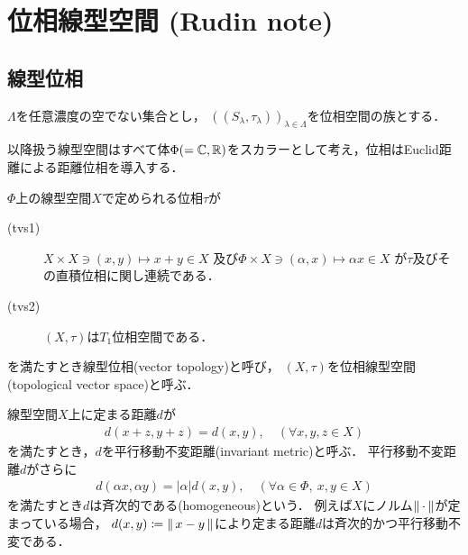 \section{位相線型空間 (Rudin note)}
\subsection{線型位相}
	\begin{screen}
		\begin{thm}[多変数連続写像は一変数写像として連続]
		\label{thm:multivariable_continuous_mapping_is_one_variable_continuous}
			$\Lambda$を任意濃度の空でない集合とし，
			$\left( (S_\lambda,\tau_\lambda) \right)_{\lambda \in \Lambda}$を位相空間の族とする．
			
		\end{thm}
	\end{screen}
	
	以降扱う線型空間はすべて体$\Phi (=\mathbb{C},\mathbb{R})$をスカラーとして考え，位相はEuclid距離による距離位相を導入する．
	
	\begin{screen}
		\begin{dfn}[位相線型空間]\label{def:topological_vector_space}
			$\Phi$上の線型空間$X$で定められる位相$\tau$が
			\begin{description}
				\item[(tvs1)] $X \times X \ni (x,y) \longmapsto x+y \in X$
					及び$\Phi \times X \ni (\alpha,x) \longmapsto \alpha x \in X$
					が$\tau$及びその直積位相に関し連続である．
				\item[(tvs2)]
					$(X,\tau)$は$T_1$位相空間である．
			\end{description}
			を満たすとき線型位相(vector topology)と呼び，
			$(X,\tau)$を位相線型空間(topological vector space)と呼ぶ．
		\end{dfn}
	\end{screen}
	
	\begin{screen}
		\begin{thm}[位相線型空間は$T_3$]
		\end{thm}
	\end{screen}
	
	\begin{screen}
		\begin{dfn}[平行移動不変距離]
			線型空間$X$上に定まる距離$d$が
			\begin{align}
				d(x+z, y+z) = d(x,y),\quad (\forall x,y,z \in X)
			\end{align}
			を満たすとき，$d$を平行移動不変距離(invariant metric)と呼ぶ．
			平行移動不変距離$d$がさらに
			\begin{align}
				d(\alpha x, \alpha y) = |\alpha| d(x,y),
				\quad (\forall \alpha \in \Phi,\ x,y \in X)
			\end{align}
			を満たすとき$d$は斉次的である(homogeneous)という．
			例えば$X$にノルム$\left\|\, \cdot\, \right\|_{}$が定まっている場合，
			$d(x,y) \coloneqq \left\|\, x-y\, \right\|_{}$により定まる距離$d$は斉次的かつ平行移動不変である．
		\end{dfn}
	\end{screen}
	
